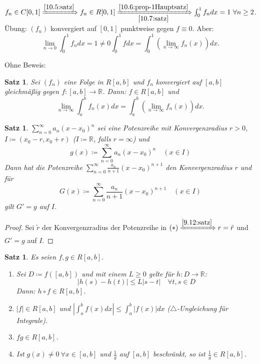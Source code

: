 \documentclass[14pt,titlepage,ngerman,a4paper,headsepline,DIV15,halfparskip*]{scrartcl}
\newcommand{\R}{\mathbb{R}}
\theoremstyle{named}
\theoremstyle{dotless}
\newtheorem{satz}[namedtheorem]{Satz}
\begin{document}
$f_{n} \in C[0, 1] \xRightarrow[]{\ref{10.5:satz}} f_{n} \in R[0, 1] \xRightarrow[\ref{10.7:satz}]{\ref{10.6:prop-1Hauptsatz}} \int_{0}^{1} f_{n} dx = 1 ~\forall n \geq 2$. \\
Übung: $(f_{n})$ konvergiert auf $[0, 1]$ punktweise gegen $f \equiv 0$. Aber: 
	$$ \lim_{n \rightarrow 0} \int_{0}^{1} f_{n} dx = 1 \neq 0 \int_{0}^{1} f dx = \int_{0}^{1} \left( \lim_{n \rightarrow \infty} f_{n}(x) \right) dx. $$

Ohne Beweis:

\begin{satz} \label{10.8:satz}
	Sei $(f_{n})$ eine Folge in $R[a, b]$ und $f_{n}$ konvergiert auf $[a, b]$ gleichmä{\ss}ig gegen $f \colon [a, b] \rightarrow \R$. Dann: $f \in R[a, b]$ und
	$$ \lim_{n \rightarrow \infty} \int_{a}^{b} f_{n}(x) dx = \int_{a}^{b} \left( \lim_{n \rightarrow \infty} f_{n}(x) \right) dx. $$
\end{satz}


\begin{satz} \label{10.9:satz}
	$\sum_{n=0}^{\infty} a_{n} (x - x_{0})^{n}$ sei eine Potenzreihe mit Konvergenzradius $r > 0$, $I \coloneqq (x_{0} - r, x_{0} + r)$ ($I \coloneqq \R$, falls $r = \infty$) und
	$$ g(x) \coloneqq \sum_{n=0}^{\infty} a_{n} (x - x_{0})^{n} \quad (x \in I) $$
	Dann hat die Potenzreihe $\sum_{n=0}^{\infty} \frac{a_{n}}{n + 1} (x - x_{0})^{n+1}$ den Konvergenzradius $r$ und für
	\[ G(x) \coloneqq \sum_{n=0}^{\infty} \frac{a_{n}}{n + 1} (x - x_{0})^{n+1} \quad (x \in I) \tag*{$(*)$} \]
	gilt $G' = g$ auf $I$.
\end{satz}

\begin{proof}
	Sei $\tilde{r}$ der Konvergenzradius der Potenzreihe in $(*) \xRightarrow[]{\ref{9.12:satz}} r = \tilde{r}$ und $G' = g$ auf $I$.	
\end{proof}


\begin{satz} \label{10.10:satz}
	Es seien $f, g \in R[a, b]$.
	\begin{enumerate}
		\item Sei $D \coloneqq f([a, b])$ und mit einem $L \geq 0$ gelte für $h \colon D \rightarrow \R$:
			$$ |h(s) - h(t)| \leq L |s - t| \quad \forall t, s \in D $$
			Dann: $h \circ f \in R[a, b]$.
		\item $|f| \in R[a, b]$ und $|\int_{a}^{b} f(x) dx| \leq \int_{a}^{b} |f(x)| dx$ ($\triangle$-Ungleichung für Integrale).
		\item $fg \in R[a, b]$.
		\item Ist $g(x) \neq 0 ~\forall x \in [a, b]$ und $\frac{1}{g}$ auf $[a, b]$ beschränkt, so ist $\frac{1}{g} \in R[a, b]$.
	\end{enumerate}
\end{satz}
\end{document}
